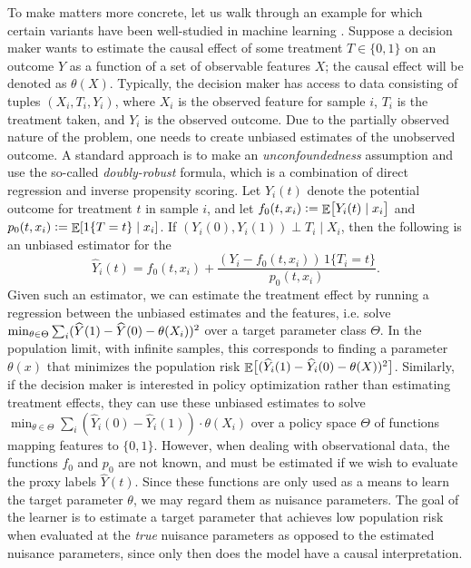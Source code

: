 \documentclass[11pt]{article} %
\theoremstyle{theorem}  %
\theoremstyle{plain}
\DeclarePairedDelimiter{\brk}{[}{]}
\DeclarePairedDelimiter{\prn}{(}{)}
\DeclareMathOperator{\En}{\mathbb{E}}
\newcommand{\ldef}{\vcentcolon=}
\newcommand{\wh}[1]{\widehat{#1}}
\newcommand{\target}{\Theta}
\renewcommand{\hat}[1]{\wh{#1}}
\newcommand{\indep}{\perp}
\newcommand{\param}{parameter\xspace}
\begin{document}
To make matters more concrete, let us walk through an example for which certain variants have been well-studied in machine learning \citep{dudik2011doubly,swaminathan2015counterfactual,nie2017quasi,kallus2018policy}. Suppose a decision maker wants to estimate the causal effect of some treatment $T\in \{0,1\}$ on an outcome $Y$ as a function of a set of observable features $X$; the causal effect will be denoted as $\theta(X)$. Typically, the decision maker has access to data consisting of tuples $(X_i, T_i, Y_i)$, where $X_i$ is the observed feature for sample $i$, $T_i$ is the treatment taken, and $Y_i$ is the observed outcome. 
%
Due to the partially observed nature of the problem, one needs to create unbiased estimates of the unobserved outcome. A standard approach is to make an \emph{unconfoundedness} assumption \citep{rosenbaum1983central} and use the so-called \emph{doubly-robust} formula, which is a combination of direct regression and inverse propensity scoring. Let $Y_i(t)$ denote the potential outcome for treatment $t$ in sample $i$, and let $f_0(t,x_i)\ldef\En\brk[\big]{Y_i(t) \mid x_i}$ and $p_0(t,x_i) \ldef \En\brk*{1\{T=t\} \mid x_i}$. If $(Y_i(0),Y_i(1))\indep{}T_i\mid{}X_i$, then the following is an unbiased estimator for the 
\begin{equation}
\hat{Y}_i{(t)} = f_0(t,x_i) + \frac{(Y_i - f_0(t,x_i))\, 1\{T_i=t\}}{p_0(t,x_i)}.
\end{equation}
Given such an estimator, we can estimate the treatment effect by running a regression between the unbiased estimates and the features, i.e. solve $\min_{\theta\in \target} \sum_i \prn{\hat{Y}(1) - \hat{Y}(0) - \theta(X_i)}^2$ over a target parameter class $\target$. In the population limit, with infinite samples, this corresponds to finding a \param $\theta(x)$ that minimizes the population risk $\En\brk[\big]{(\hat{Y}_i(1) - \hat{Y}_i(0) - \theta(X))^2}$. Similarly, if the decision maker is interested in policy optimization rather than estimating treatment effects, they can use these unbiased estimates to solve $\min_{\theta\in \target} \sum_{i} (\hat{Y}_i(0) - \hat{Y}_i(1))\cdot \theta(X_i)$ over a policy space $\target$ of functions mapping features to $\{0,1\}$. However, when dealing with observational data, the functions $f_0$ and $p_0$ are not known, and must be estimated if we wish to evaluate the proxy labels $\hat{Y}(t)$. Since these functions are only used as a means to learn the target parameter $\theta$, we may regard them as nuisance parameters. The goal of the learner is to estimate a target parameter that achieves low population risk when evaluated at the \emph{true} nuisance parameters as opposed to the estimated nuisance parameters, since only then does the model have a causal interpretation. 
\end{document}
